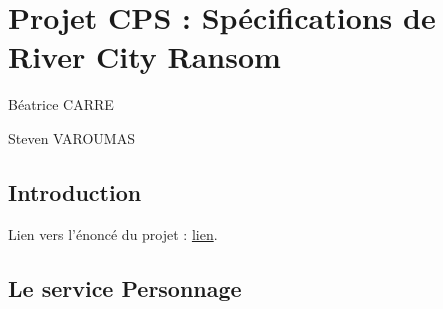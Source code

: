 \documentclass[a4paper, 11pt]{report}
\begin{document}
\chapter{Projet CPS : Spécifications de River City Ransom}

Béatrice CARRE

Steven VAROUMAS

\section*{Introduction}
Lien vers l'énoncé du projet : 
\href{http://www-master.ufr-info-p6.jussieu.fr/2013/spip.php?action=acceder_document&arg=2148&cle=11624d21d0734169986d403a88c3f6e4e1755b65&file=pdf\%2Fsujet_projet_2014.pdf}{lien}.

\section{Le service Personnage}
\end{document}
